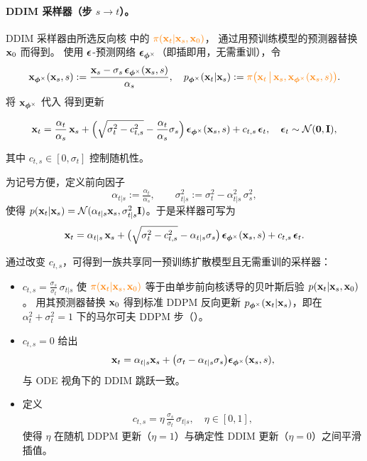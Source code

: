 \paragraph{DDIM 采样器（步 $s\to t$）。}
DDIM 采样器由所选反向核  中的 ${\color{orange}\pi({\mathbf{x}}_t|{\mathbf{x}}_s,{\mathbf{x}}_0)}$，
通过用预训练模型的预测器替换 ${\mathbf{x}}_0$ 而得到。
使用 ${\bm{\epsilon}}$-预测网络 ${\bm{\epsilon}}_{\bm{\phi}^\times}$（即插即用，无需重训），令
\[
{\mathbf{x}}_{\bm{\phi}^\times}({\mathbf{x}}_s,s)
:= \frac{{\mathbf{x}}_s - \sigma_s\,{\bm{\epsilon}}_{\bm{\phi}^\times}({\mathbf{x}}_s,s)}{\alpha_s},
\quad
p_{\bm{\phi}^\times}({\mathbf{x}}_t|{\mathbf{x}}_s)
:= {\color{orange}\pi\big({\mathbf{x}}_t\,\big|\,{\mathbf{x}}_s,{\mathbf{x}}_{\bm{\phi}^\times}({\mathbf{x}}_s,s)\big)}.
\]
将 ${\mathbf{x}}_{\bm{\phi}^\times}$ 代入  得到更新
\begin{mdframed}
\[
{\mathbf{x}}_t
= \frac{\alpha_t}{\alpha_s}\,{\mathbf{x}}_s
+\Big(\sqrt{\sigma_t^2 - c_{t,s}^2}-\frac{\alpha_t}{\alpha_s}\sigma_s\Big)\,
{\bm{\epsilon}}_{\bm{\phi}^\times}({\mathbf{x}}_s,s)
+ c_{t,s}\,{\bm{\epsilon}}_t,
\quad {\bm{\epsilon}}_t\sim\mathcal{N}(\mathbf{0},\mathbf{I}),
\]
\end{mdframed}
其中 $c_{t,s}\in[0,\sigma_t]$ 控制随机性。

为记号方便，定义前向因子
\[
\alpha_{t|s}:=\tfrac{\alpha_t}{\alpha_s},
\qquad
\sigma_{t|s}^2:=\sigma_t^2-\alpha_{t|s}^2\,\sigma_s^2,
\]
使得 $p({\mathbf{x}}_t|{\mathbf{x}}_s)=\mathcal{N}(\alpha_{t|s}{\mathbf{x}}_s,\sigma_{t|s}^2\mathbf{I})$。于是采样器可写为
\[
{\mathbf{x}}_t
= \alpha_{t|s}\,{\mathbf{x}}_s
+\big(\sqrt{\sigma_t^2 - c_{t,s}^2}-\alpha_{t|s}\sigma_s\big)\,
{\bm{\epsilon}}_{\bm{\phi}^\times}({\mathbf{x}}_s,s)
+ c_{t,s}\,{\bm{\epsilon}}_t.
\]

通过改变 $c_{t,s}$，可得到一族共享同一预训练扩散模型且无需重训的采样器：
\begin{itemize}
\item {}
$
c_{t,s}=\frac{\sigma_s}{\sigma_t}\,\sigma_{t|s}
$
使 ${\color{orange}\pi({\mathbf{x}}_t|{\mathbf{x}}_s,{\mathbf{x}}_0)}$ 等于由单步前向核诱导的贝叶斯后验
$p({\mathbf{x}}_t|{\mathbf{x}}_s,{\mathbf{x}}_0)$。
用其预测器替换 ${\mathbf{x}}_0$ 得到标准 DDPM 反向更新
$p_{\bm{\phi}^\times}({\mathbf{x}}_t|{\mathbf{x}}_s)$，即在 $\alpha_t^2+\sigma_t^2=1$ 下的马尔可夫 DDPM 步（）。

\item {}
$
c_{t,s}=0
$
给出
\[
{\mathbf{x}}_t
= \alpha_{t|s}{\mathbf{x}}_s + \big(\sigma_t-\alpha_{t|s}\sigma_s\big){\bm{\epsilon}}_{\bm{\phi}^\times}({\mathbf{x}}_s,s),
\]
与 ODE 视角下的 DDIM 跳跃一致。

\item {} 定义
\begin{align}\label{eq:eta-ddim}
    c_{t,s}=\eta\,\frac{\sigma_s}{\sigma_t}\,\sigma_{t|s}, \quad \eta\in[0,1],
\end{align}
使得 $\eta$ 在随机 DDPM 更新（$\eta=1$）与确定性 DDIM 更新（$\eta=0$）之间平滑插值。
\end{itemize}






